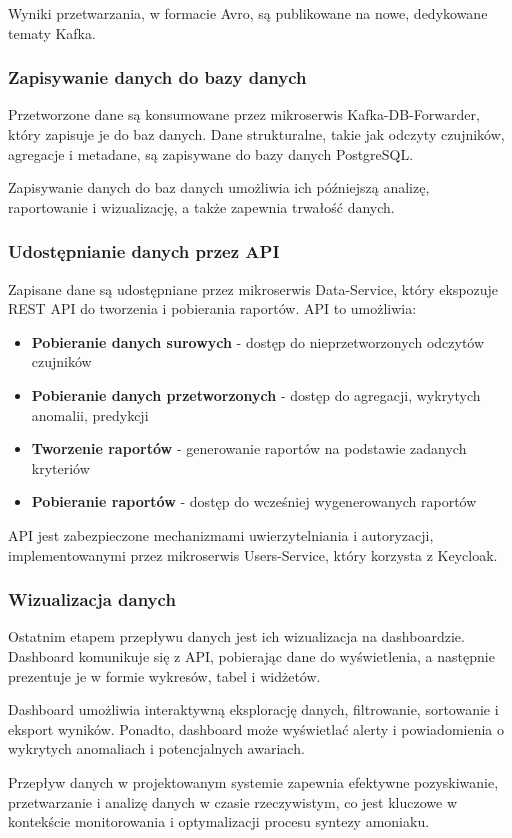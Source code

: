 Wyniki przetwarzania, w formacie Avro, są publikowane na nowe, dedykowane tematy Kafka.

\subsubsection{Zapisywanie danych do bazy danych}
\label{subsubsec:zapisywanie_danych}

Przetworzone dane są konsumowane przez mikroserwis Kafka-DB-Forwarder, który zapisuje je do baz danych. Dane strukturalne, takie jak odczyty czujników,
agregacje i metadane, są zapisywane do bazy danych PostgreSQL.

Zapisywanie danych do baz danych umożliwia ich późniejszą analizę, raportowanie i wizualizację, a także zapewnia trwałość danych.

\subsubsection{Udostępnianie danych przez API}
\label{subsubsec:udostepnianie_danych}

Zapisane dane są udostępniane przez mikroserwis Data-Service, który ekspozuje REST API do tworzenia i pobierania raportów. API to umożliwia:

\begin{itemize}
    \item \textbf{Pobieranie danych surowych} - dostęp do nieprzetworzonych odczytów czujników
    \item \textbf{Pobieranie danych przetworzonych} - dostęp do agregacji, wykrytych anomalii, predykcji
    \item \textbf{Tworzenie raportów} - generowanie raportów na podstawie zadanych kryteriów
    \item \textbf{Pobieranie raportów} - dostęp do wcześniej wygenerowanych raportów
\end{itemize}

API jest zabezpieczone mechanizmami uwierzytelniania i autoryzacji, implementowanymi przez mikroserwis Users-Service, który korzysta z Keycloak.

\subsubsection{Wizualizacja danych}
\label{subsubsec:wizualizacja_danych}

Ostatnim etapem przepływu danych jest ich wizualizacja na dashboardzie. Dashboard komunikuje się z API, pobierając dane do wyświetlenia, a następnie prezentuje je w formie wykresów, tabel i widżetów.

Dashboard umożliwia interaktywną eksplorację danych, filtrowanie, sortowanie i eksport wyników. Ponadto, dashboard może wyświetlać alerty i powiadomienia o wykrytych anomaliach i potencjalnych awariach.

Przepływ danych w projektowanym systemie zapewnia efektywne pozyskiwanie, przetwarzanie i analizę danych w czasie rzeczywistym, co jest kluczowe w kontekście monitorowania i optymalizacji procesu syntezy amoniaku. 